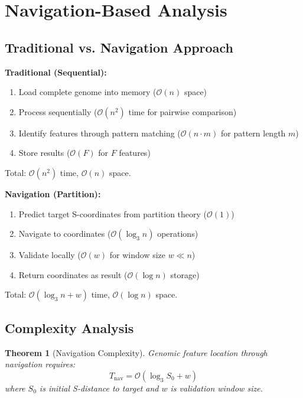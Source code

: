 \documentclass[twocolumn,10pt]{article}
\newtheorem{theorem}{Theorem}[section]
\theoremstyle{remark}
\newcommand{\bigO}{\mathcal{O}}
\begin{document}
\section{Navigation-Based Analysis}

\subsection{Traditional vs. Navigation Approach}

\textbf{Traditional (Sequential):}
\begin{enumerate}
\item Load complete genome into memory ($\bigO(n)$ space)
\item Process sequentially ($\bigO(n^2)$ time for pairwise comparison)
\item Identify features through pattern matching ($\bigO(n \cdot m)$ for pattern length $m$)
\item Store results ($\bigO(F)$ for $F$ features)
\end{enumerate}

Total: $\bigO(n^2)$ time, $\bigO(n)$ space.

\textbf{Navigation (Partition):}
\begin{enumerate}
\item Predict target S-coordinates from partition theory ($\bigO(1)$)
\item Navigate to coordinates ($\bigO(\log_3 n)$ operations)
\item Validate locally ($\bigO(w)$ for window size $w \ll n$)
\item Return coordinates as result ($\bigO(\log n)$ storage)
\end{enumerate}

Total: $\bigO(\log_3 n + w)$ time, $\bigO(\log n)$ space.

\subsection{Complexity Analysis}

\begin{theorem}[Navigation Complexity]
\label{thm:nav_complexity}
Genomic feature location through navigation requires:
\begin{equation}
T_{\text{nav}} = \bigO(\log_3 S_0 + w)
\end{equation}
where $S_0$ is initial S-distance to target and $w$ is validation window size.
\end{theorem}
\end{document}
